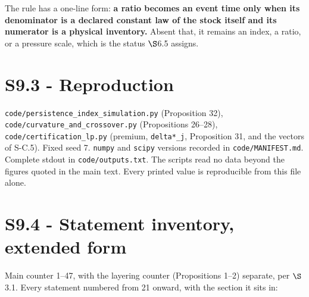 \documentclass[11pt]{article}
\begin{document}
The rule has a one-line form: \textbf{a ratio becomes an event time only when its denominator is a declared constant law of the stock itself and its numerator is a physical inventory.} Absent that, it remains an index, a ratio, or a pressure scale, which is the status \(\S\)6.5 assigns.

\vspace{0.8em}

\section*{S9.3 - Reproduction}\label{s93---reproduction}

\texttt{code/\allowbreak{}persistence\_\allowbreak{}index\_simula\allowbreak{}tion.\allowbreak{}py} (Proposition 32), \texttt{code/\allowbreak{}curvature\_an\allowbreak{}d\_crossover.\allowbreak{}py} (Propositions 26--28), \texttt{code/\allowbreak{}certificatio\allowbreak{}n\_lp.\allowbreak{}py} (premium, \texttt{delta*\_j}, Proposition 31, and the vectors of S-C.5). Fixed seed 7. \texttt{numpy} and \texttt{scipy} versions recorded in \texttt{code/\allowbreak{}MANIFEST.\allowbreak{}md}. Complete stdout in \texttt{code/\allowbreak{}outputs.\allowbreak{}txt}. The scripts read no data beyond the figures quoted in the main text. Every printed value is reproducible from this file alone.

\section*{S9.4 - Statement inventory, extended form}\label{s94---statement-inventory-extended-form}

Main counter 1--47, with the layering counter (Propositions 1--2) separate, per \(\S\)3.1. Every statement numbered from 21 onward, with the section it sits in:
\end{document}
